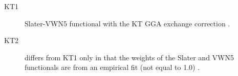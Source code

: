 \begin{description}
\begin{description}








\item[KT1] Slater-VWN5 functional with the KT GGA exchange correction
  \cite{dft:kt12,dft:kt12a}.

\item[KT2] differs from KT1 only in that the weights of the Slater and
  VWN5 functionals are from an empirical fit (not equal to 1.0)
  \cite{dft:kt12,dft:kt12a}.


\end{description}
\end{description}
